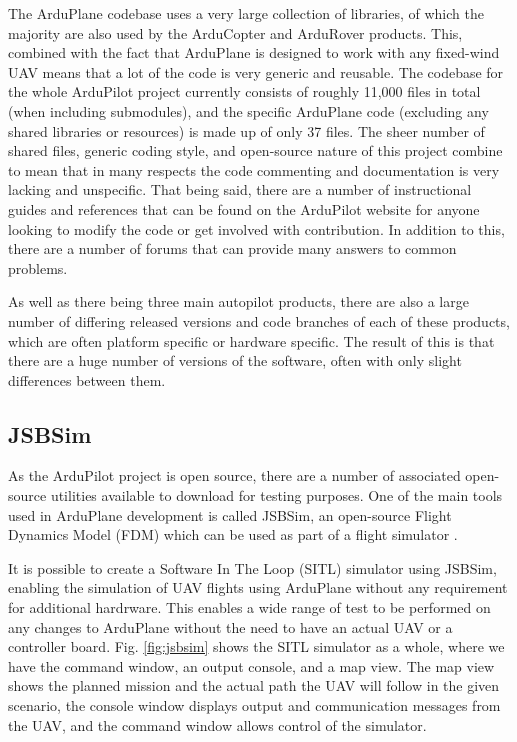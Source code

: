 The ArduPlane codebase uses a very large collection of libraries, of which the majority are also used by the ArduCopter and ArduRover products. This, combined with the fact that ArduPlane is designed to work with any fixed-wind UAV means that a lot of the code is very generic and reusable. The codebase for the whole ArduPilot project currently consists of roughly 11,000 files in total (when including submodules), and the specific ArduPlane code (excluding any shared libraries or resources) is made up of only 37 files. The sheer number of shared files, generic coding style, and open-source nature of this project combine to mean that in many respects the code commenting and documentation is very lacking and unspecific. That being said, there are a number of instructional guides and references that can be found on the ArduPilot website for anyone looking to modify the code or get involved with contribution. In addition to this, there are a number of forums that can provide many answers to common problems. 

As well as there being three main autopilot products, there are also a large number of differing released versions and code branches of each of these products, which are often platform specific or hardware specific. The result of this is that there are a huge number of versions of the software, often with only slight differences between them.


\subsection{JSBSim}
\label{intro:jsbsim}

As the ArduPilot project is open source, there are a number of associated open-source utilities available to download for testing purposes. One of the main tools used in ArduPlane development is called JSBSim, an open-source Flight Dynamics Model (FDM) which can be used as part of a flight simulator \cite{jsbsim}. 

It is possible to create a Software In The Loop (SITL) simulator using JSBSim, enabling the simulation of UAV flights using ArduPlane without any requirement for additional hardrware. This enables a wide range of test to be performed on any changes to ArduPlane without the need to have an actual UAV or a controller board. Fig. \ref{fig:jsbsim} shows the SITL simulator as a whole, where we have the command window, an output console, and a map view. The map view shows the planned mission and the actual path the UAV will follow in the given scenario, the console window displays output and communication messages from the UAV, and the command window allows control of the simulator.


